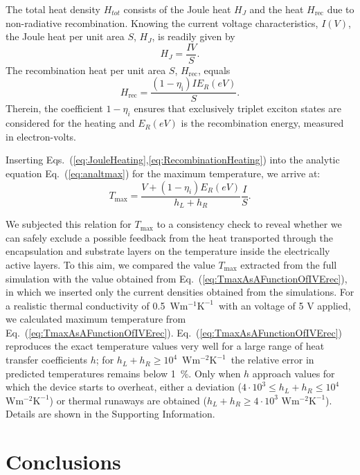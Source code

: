 \documentclass[%
9pt,
 aip,
rsi,%
 amsmath,amssymb,
preprint,%
]{revtex4-1}
\newcommand{\thermalconductivity}{$\mathrm{W m^{-1} K^{-1}}$}
\newcommand{\hcoefficient}{$\mathrm{W m^{-2} K^{-1}}$}
\begin{document}
The total heat density $H_{tot}$ consists of the Joule heat $H_J$ and the heat $H_{\mathrm{rec}}$ due to non-radiative recombination.
Knowing the current voltage characteristics, $I(V)$, the Joule heat per unit area $S$, $H_{J}$, is readily given by
\begin{equation}
		H_{J}= \frac{I V}{S}. \label{eq:JouleHeating} 
\end{equation}
The recombination heat per unit area $S$, $H_{\mathrm{rec}}$, equals
\begin{equation}
		H_{\mathrm{rec}} = \frac{(1-\eta_\mathrm{i}) I E_R(eV)}{S}. 		\label{eq:RecombinationHeating}
\end{equation}
Therein, the coefficient $1-\eta_i$ ensures that exclusively triplet exciton states are considered for the heating and $E_R(eV)$ is the recombination energy, measured in electron-volts. 

Inserting Eqs.~(\ref{eq:JouleHeating},\ref{eq:RecombinationHeating}) into the analytic equation Eq.~(\ref{eq:analtmax}) for the maximum temperature, we arrive at:
\begin{equation}
	T_{\mathrm{max}}=\frac{ V+(1-\eta_i) E_R\left(eV\right) }{h_L+h_R} \frac{I}{S}.
    \label{eq:TmaxAsAFunctionOfIVErec}
\end{equation}


We subjected this relation for $T_{\mathrm{max}}$ to a consistency check to reveal whether we can safely exclude a possible feedback from the heat transported through the encapsulation and substrate layers on the temperature inside the electrically active layers.
To this aim, we compared the value $T_{\mathrm{max}}$ extracted from the full simulation with the value obtained from Eq.~(\ref{eq:TmaxAsAFunctionOfIVErec}), in which we inserted only the current densities obtained from  the simulations. For a realistic thermal conductivity of 0.5~\thermalconductivity~with an voltage of 5 V applied, we calculated maximum temperature from Eq.~(\ref{eq:TmaxAsAFunctionOfIVErec}). 
Eq.~(\ref{eq:TmaxAsAFunctionOfIVErec}) reproduces the exact temperature values very well for a large range of heat transfer coefficients $h$; for $h_L + h_R \geq 10^{4}$~\hcoefficient~the relative error in predicted temperatures remains below 1~\%. 
Only when $h$ approach values for which the device starts to overheat, either a deviation ($4\cdot 10^3 \leq h_L + h_R \leq 10^4$ \hcoefficient) or thermal runaways are obtained ($h_L + h_R \geq 4\cdot 10^3$ \hcoefficient). 
Details are shown in the Supporting Information.

\section{Conclusions}
\end{document}
